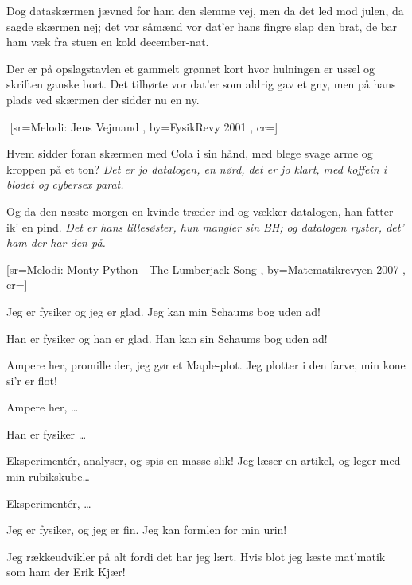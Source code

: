 \documentclass[pdftex,12pt]{article}
\begin{document}
\begin{songs}{}
\beginverse
Dog dataskærmen jævned
for ham den slemme vej,
men da det led mod julen,
da sagde skærmen nej;
det var såmænd vor dat'er
hans fingre slap den brat,
de bar ham væk fra stuen
en kold december-nat.
\endverse

\beginverse
Der er på opslagstavlen
et gammelt grønnet kort
hvor hulningen er ussel
og skriften ganske bort.
Det tilhørte vor dat'er
som aldrig gav et gny,
men på hans plads ved skærmen
der sidder nu en ny.
\endverse
\endsong



﻿%
[sr={Melodi: Jens Vejmand}
,
by={FysikRevy 2001}
,
cr={}]\hypertarget{Hvem sidder foran skærmen}{}
\label{song64}

\beginverse
Hvem sidder foran skærmen
med Cola i sin hånd,
med blege svage arme
og kroppen på et ton?
\emph{Det er jo datalogen,
en nørd, det er jo klart,
med koffein i blodet
og cybersex parat.}

\endverse
\beginverse
Og da den næste morgen
en kvinde træder ind
og vækker datalogen,
han fatter ik' en pind.
\emph{Det er hans lillesøster,
hun mangler sin BH;
og datalogen ryster,
det' ham der har den på.}

\endverse
\endsong



﻿[sr={Melodi: Monty Python - The Lumberjack Song}
,
by={Matematikrevyen 2007}
,
cr={}]\hypertarget{Jeg er fysiker}{}
\label{song65}

\beginverse
Jeg er fysiker og jeg er glad.
Jeg kan min Schaums bog uden ad!
\endverse

\beginverse
Han er fysiker og han er glad.
Han kan sin Schaums bog uden ad!
\endverse

\beginverse
Ampere her, promille der,
jeg gør et Maple-plot.
Jeg plotter i den farve,
min kone si’r er flot!
\endverse

\beginverse
Ampere her, \ldots
\endverse

\beginverse
Han er fysiker \ldots
\endverse

\beginverse
Eksperimentér, analyser,
og spis en masse slik!
Jeg læser en artikel,
og leger med min rubikskube\ldots
\endverse

\beginverse
Eksperimentér, \ldots
\endverse

\beginverse
Jeg er fysiker, og jeg er fin.
Jeg kan formlen for min urin!
\endverse

\beginverse
Jeg rækkeudvikler på alt
fordi det har jeg lært.
Hvis blot jeg læste mat'matik
som ham der Erik Kjær!
\endverse


\end{songs}
\end{document}
